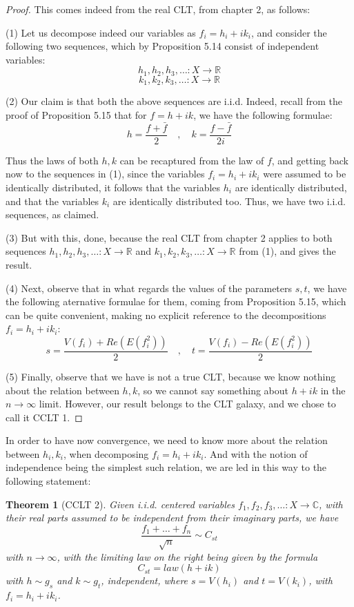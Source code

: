 \documentclass[12pt]{amsbook}
\newtheorem{theorem}{Theorem}[chapter]
\begin{document}
\begin{proof}
This comes indeed from the real CLT, from chapter 2, as follows:

\medskip

(1) Let us decompose indeed our variables as $f_i=h_i+ik_i$, and consider the following two sequences, which by Proposition 5.14 consist of independent variables:
$$h_1,h_2,h_3,\ldots:X\to\mathbb R$$
$$k_1,k_2,k_3,\ldots:X\to\mathbb R$$

(2) Our claim is that both the above sequences are i.i.d. Indeed, recall from the proof of Proposition 5.15 that for $f=h+ik$, we have the following formulae:
$$h=\frac{f+\bar{f}}{2}\quad,\quad k=\frac{f-\bar{f}}{2i}$$

Thus the laws of both $h,k$ can be recaptured from the law of $f$, and getting back now to the sequences in (1), since the variables $f_i=h_i+ik_i$ were assumed to be identically distributed, it follows that the variables $h_i$ are identically distributed, and that the variables $k_i$ are identically distributed too. Thus, we have two i.i.d. sequences, as claimed.

\medskip

(3) But with this, done, because the real CLT from chapter 2 applies to both sequences $h_1,h_2,h_3,\ldots:X\to\mathbb R$ and $k_1,k_2,k_3,\ldots:X\to\mathbb R$ from (1), and gives the result.

\medskip

(4) Next, observe that in what regards the values of the parameters $s,t$, we have the following aternative formulae for them, coming from Proposition 5.15, which can be quite convenient, making no explicit reference to the decompositions $f_i=h_i+ik_i$:
$$s=\frac{V(f_i)+Re(E(f_i^2))}{2}\quad,\quad t=\frac{V(f_i)-Re(E(f_i^2))}{2}$$

(5) Finally, observe that we have is not a true CLT, because we know nothing about the relation between $h,k$, so we cannot say something about $h+ik$ in the $n\to\infty$ limit. However, our result belongs to the CLT galaxy, and we chose to call it CCLT 1.
\end{proof}

In order to have now convergence, we need to know more about the relation between $h_i,k_i$, when decomposing $f_i=h_i+ik_i$. And with the notion of independence being the simplest such relation, we are led in this way to the following statement:

\begin{theorem}[CCLT 2]
Given i.i.d. centered variables $f_1,f_2,f_3,\ldots:X\to\mathbb C$, with their real parts assumed to be independent from their imaginary parts, we have
$$\frac{f_1+\ldots+f_n}{\sqrt{n}}\sim C_{st}$$
with $n\to\infty$, with the limiting law on the right being given by the formula
$$C_{st}=law(h+ik)$$
with $h\sim g_s$ and $k\sim g_t$, independent, where $s=V(h_i)$ and $t=V(k_i)$, with $f_i=h_i+ik_i$. 
\end{theorem}
\end{document}
